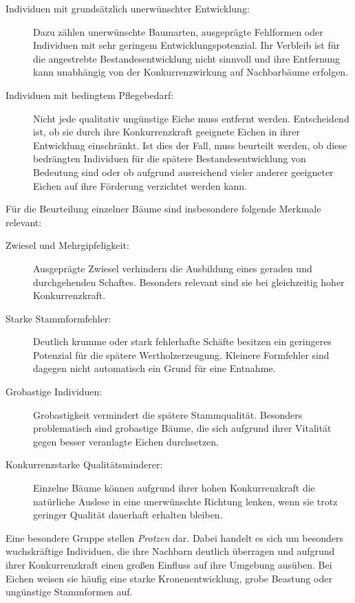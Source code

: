 \documentclass[twocolumn, bibliography=totoc, abstract=true]{scrartcl}
\begin{document}
\begin{description}
\item[Individuen mit grundsätzlich unerwünschter Entwicklung:] Dazu zählen unerwünschte Baumarten, ausgeprägte Fehlformen oder Individuen mit sehr geringem Entwicklungspotenzial. Ihr Verbleib ist für die angestrebte Bestandesentwicklung nicht sinnvoll und ihre Entfernung kann unabhängig von der Konkurrenzwirkung auf Nachbarbäume erfolgen.
\item[Individuen mit bedingtem Pflegebedarf:] Nicht jede qualitativ ungünstige Eiche muss entfernt werden. Entscheidend ist, ob sie durch ihre Konkurrenzkraft geeignete Eichen in ihrer Entwicklung einschränkt. Ist dies der Fall, muss beurteilt werden, ob diese bedrängten Individuen für die spätere Bestandesentwicklung von Bedeutung sind oder ob aufgrund ausreichend vieler anderer geeigneter Eichen auf ihre Förderung verzichtet werden kann.
\end{description}

Für die Beurteilung einzelner Bäume sind insbesondere folgende Merkmale relevant:

\begin{description}
\item[Zwiesel und Mehrgipfeligkeit:] Ausgeprägte Zwiesel verhindern die Ausbildung eines geraden und durchgehenden Schaftes. Besonders relevant sind sie bei gleichzeitig hoher Konkurrenzkraft.
\item[Starke Stammformfehler:] Deutlich krumme oder stark fehlerhafte Schäfte besitzen ein geringeres Potenzial für die spätere Wertholzerzeugung. Kleinere Formfehler sind dagegen nicht automatisch ein Grund für eine Entnahme.
\item[Grobastige Individuen:] Grobastigkeit vermindert die spätere Stammqualität. Besonders problematisch sind grobastige Bäume, die sich aufgrund ihrer Vitalität gegen besser veranlagte Eichen durchsetzen.
\item[Konkurrenzstarke Qualitätsminderer:] Einzelne Bäume können aufgrund ihrer hohen Konkurrenzkraft die natürliche Auslese in eine unerwünschte Richtung lenken, wenn sie trotz geringer Qualität dauerhaft erhalten bleiben.
\end{description}

Eine besondere Gruppe stellen \emph{Protzen} dar. Dabei handelt es sich um besonders wuchskräftige Individuen, die ihre Nachbarn deutlich überragen und aufgrund ihrer Konkurrenzkraft einen großen Einfluss auf ihre Umgebung ausüben. Bei Eichen weisen sie häufig eine starke Kronenentwicklung, grobe Beastung oder ungünstige Stammformen auf.
\end{document}
